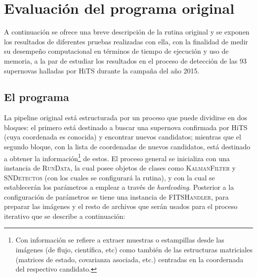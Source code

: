 \chapter{Evaluaci\'on del programa original}
\label{ch:prev_work}

A continuaci\'on se ofrece una breve descripci\'on de la rutina original y se exponen los resultados de diferentes pruebas realizadas con ella, con la finalidad de medir su desempe\~no computacional en t\'erminos de tiempo de ejecuci\'on y uso de memoria, a la par de estudiar los resultados en el proceso de detecci\'on de las 93 supernovas halladas por HiTS durante la campa\~na del a\~no 2015.
\bigskip


\section{El programa}

La pipeline original est\'a estructurada por un proceso que puede dividirse en dos bloques: el primero est\'a destinado a buscar una supernova confirmada por HiTS (cuya coordenada es conocida) y encontrar nuevos candidatos; mientras que el segundo bloque, con la lista de coordenadas de nuevos candidatos, est\'a destinado a obtener la informaci\'on\footnote{Con informaci\'on se refiere a extraer muestras o estampillas desde las im\'agenes (de flujo, cient\'ifica, etc) como tambi\'en de las estructuras matriciales (matrices de estado, covarianza asociada, etc.) centradas en la coordernada del respectivo candidato.} de estos. El proceso general se inicializa con una instancia de \textsc{RunData}, la cual posee objetos de clases como \textsc{KalmanFilter} y \textsc{SNDetectos} (con los cuales se configurar\'a la rutina), y con la cual se establecer\'an los par\'ametros a emplear a trav\'es de \textit{hardcoding}. Posterior a la configuraci\'on de par\'ametros se tiene una instancia de \textsc{FITSHandler}, para preparar las im\'agenes y el resto de archivos que ser\'an usados para el proceso iterativo que se describe a continuaci\'on:
\bigskip


